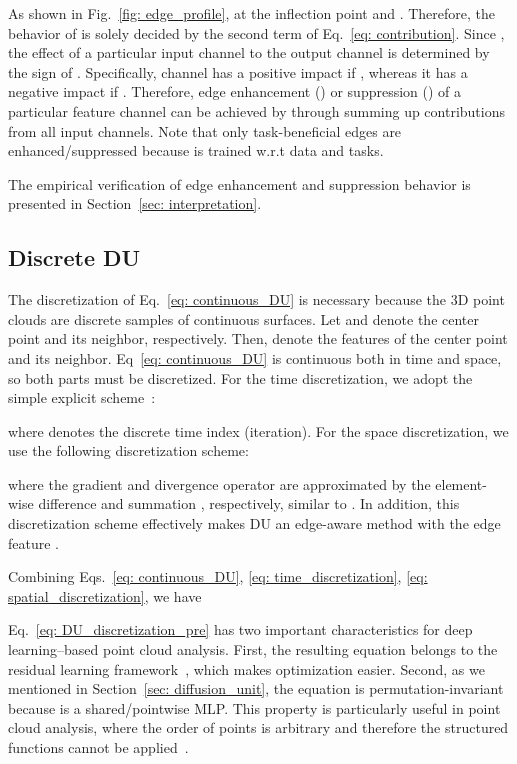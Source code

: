 \documentclass[a4paper,fleqn]{cas-dc}
\begin{document}
As shown in Fig.~\ref{fig: edge_profile}, at the inflection point  and . Therefore, the behavior of  is solely decided by the second term of Eq.~\eqref{eq: contribution}. Since , the effect of a particular input channel  to the output channel  is determined by the sign of . Specifically, channel  has a positive impact if , whereas it has a negative impact if . Therefore, edge enhancement () or suppression () of a particular feature channel  can be achieved by  through summing up contributions from all input channels. Note that only task-beneficial edges are enhanced/suppressed because  is trained w.r.t data and tasks.     

The empirical verification of edge enhancement and suppression behavior is presented in Section~\ref{sec: interpretation}. 


\subsection{Discrete DU}
\label{sec:discretization}
The discretization of Eq.~\eqref{eq: continuous_DU} is necessary because the 3D point clouds are discrete samples of continuous surfaces. Let  and  denote the center point and its neighbor, respectively. Then,  denote the features of the center point and its neighbor. Eq~\eqref{eq: continuous_DU} is continuous both in time and space, so both parts must be discretized. For the time discretization, we adopt the simple explicit scheme~\cite{weickert1998anisotropic}: 

where  denotes the discrete time index (iteration). 
For the space discretization, we use the following discretization scheme:

where the gradient  and divergence operator  are approximated by the element-wise difference  and summation , respectively, similar to \cite{chamberlain2021grand}. In addition, this discretization scheme effectively makes DU an edge-aware method with the edge feature .   


Combining Eqs.~\eqref{eq: continuous_DU}, \eqref{eq: time_discretization}, \eqref{eq: spatial_discretization}, we have



Eq.~\eqref{eq: DU_discretization_pre} has two important characteristics for deep learning--based point cloud analysis. First, the resulting equation belongs to the residual learning framework~\cite{he2016deep}, which makes optimization easier. Second, as we mentioned in Section~\ref{sec: diffusion_unit}, the equation is permutation-invariant because  is a shared/pointwise MLP. This property is particularly useful in point cloud analysis, where the order of points is arbitrary and therefore the structured functions cannot be applied~\cite{qi2017pointnet}.               
\end{document}
